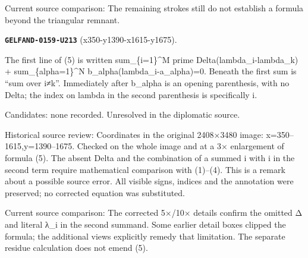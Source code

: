 Current source comparison: The remaining strokes still do not establish a formula beyond the triangular remnant.\par\medskip
\par\noindent\leavevmode{}\label{GELFAND-0159-U213}\label{GELFAND-P001468:x350-y1390-x1615-y1675}\textbf{\texttt{GELFAND-0159-U213}} (x350-y1390-x1615-y1675).\nopagebreak[4]\par
The first line of (5) is written sum\_\{i=1\}\textasciicircum{}M prime Delta(lambda\_i-lambda\_k) + sum\_\{alpha=1\}\textasciicircum{}N b\_alpha(lambda\_i-a\_alpha)=0. Beneath the first sum is “sum over i≠k”. Immediately after b\_alpha is an opening parenthesis, with no Delta; the index on lambda in the second parenthesis is specifically i.\par
Candidates: none recorded. Unresolved in the diplomatic source.\par
Historical source review: Coordinates in the original 2408×3480 image: x=350–1615,y=1390–1675. Checked on the whole image and at a 3× enlargement of formula (5). The absent Delta and the combination of a summed i with i in the second term require mathematical comparison with (1)–(4). This is a remark about a possible source error. All visible signs, indices and the annotation were preserved; no corrected equation was substituted.\par
Current source comparison: The corrected 5×/10× details confirm the omitted Δ and literal λ\_i in the second summand. Some earlier detail boxes clipped the formula; the additional views explicitly remedy that limitation. The separate residue calculation does not emend (5).\par\medskip
